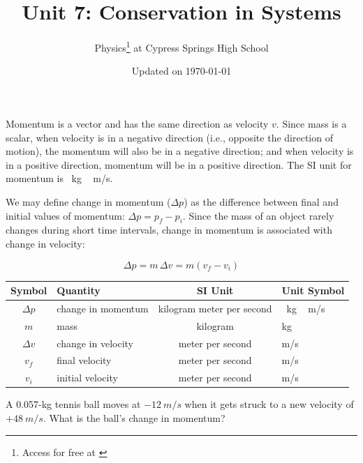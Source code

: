 \documentclass{article}
\title{Unit 7: Conservation in Systems}
\author{Physics\footnote{Access for free at \href{\openstax}{\openstax}} \hspace{0.1ex} at Cypress Springs High School}
\date{Updated on \today}
\numberwithin{equation}{section}
\numberwithin{figure}{section}
\begin{document}
\maketitle



\cyanhrule

Momentum is a vector and has the same direction as velocity $v$. Since mass is a scalar, when velocity is in a negative direction (i.e., opposite the direction of motion), the momentum will also be in a negative direction; and when velocity is in a positive direction, momentum will be in a positive direction. The SI unit for momentum is \SI{}{kg\,m/s}.
\vspace{1em}

We may define \gls{change in momentum} ($\Delta p$) as the difference between final and initial values of momentum: $\Delta p = p_f - p_i$. Since the mass of an object rarely changes during short time intervals, change in momentum is associated with change in velocity:

\begin{equation} \label{dq0Ujw}
    \Delta p = m\,\Delta v = m \left(v_f - v_i\right)
\end{equation}

\begin{center}
    \begin{tabular}{cl|cl}
    \hline
    \textbf{Symbol} & \textbf{Quantity} & \textbf{SI Unit} & \textbf{Unit Symbol}  \\
    \hline\hline
    \rule{0pt}{2.5ex}
        $\Delta p$ & change in momentum & kilogram meter per second & \SI{}{kg\,m/s}\\
        $m$ & mass & kilogram & kg\\
        $\Delta v$ & change in velocity & meter per second & m/s\\
    \hline
        $v_f$ & final velocity & meter per second & m/s\\
        $v_i$ & initial velocity & meter per second & m/s\\
    \hline
    \end{tabular}
\end{center}

\begin{example} \label{EvkSMv}
    A 0.057-kg tennis ball moves at $-\SI{12}{m/s}$ when it gets struck to a new velocity of $+\SI{48}{m/s}$. What is the ball's change in momentum?
\end{example}
\end{document}
